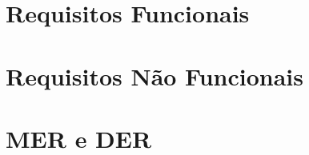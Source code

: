\documentclass[
    12pt,               %
    openright,          %
    oneside,
    a4paper,            %
    MODELO,             %
    english,            %
    brazil              %
   ]{ifsp-spo-inf-ctds}
\begin{document}
\section{Requisitos Funcionais}
\section{Requisitos Não Funcionais}
\section{MER e DER}





\end{document}
